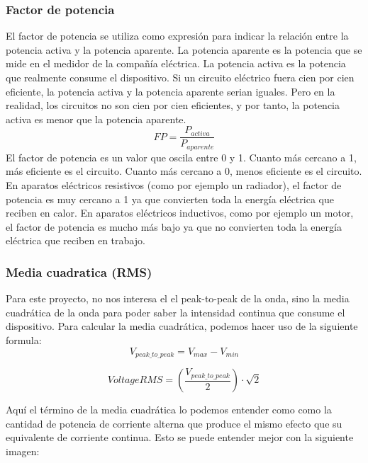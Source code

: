 \begin{titlepage}
\subsubsection{Factor de potencia}
El factor de potencia\cite{ref3} se utiliza como expresión para indicar la relación entre la potencia activa y la potencia aparente. La potencia aparente es la potencia que se mide en el medidor de la compañía eléctrica. La potencia activa es la potencia que realmente consume el dispositivo. Si un circuito eléctrico fuera cien por cien eficiente, la potencia activa y la potencia aparente serian iguales. Pero en la realidad, los circuitos no son cien por cien eficientes, y por tanto, la potencia activa es menor que la potencia aparente. \\
\begin{equation}
\label{eq:factor_potencia}
FP = \frac{P_{activa}}{P_{aparente}}
\end{equation}
El factor de potencia es un valor que oscila entre 0 y 1. Cuanto más cercano a 1, más eficiente es el circuito. Cuanto más cercano a 0, menos eficiente es el circuito. En aparatos eléctricos resistivos (como por ejemplo un radiador), el factor de potencia es muy cercano a 1 ya que convierten toda la energía eléctrica que reciben en calor. En aparatos eléctricos inductivos, como por ejemplo un motor, el factor de potencia es mucho más bajo ya que no convierten toda la energía eléctrica que reciben en trabajo.

\subsubsection{Media cuadratica (RMS)}
Para este proyecto, no nos interesa el el peak-to-peak de la onda, sino la media cuadrática\cite{ref4} de la onda para poder saber la intensidad continua que consume el dispositivo. Para calcular la media cuadrática, podemos hacer uso de la siguiente formula: \\
\begin{equation}
\label{eq:peak_to_peak}
	V_{peak\_to\_peak} = V_{max} - V_{min}
\end{equation}
	
\begin{equation}
\label{eq:media_cuadratica}
Voltage RMS = (\frac{V_{peak\_to\_peak}}{2}) \cdot \sqrt{2}
\end{equation}

Aquí el término de la media cuadrática lo podemos entender como como la cantidad de potencia de corriente alterna que produce el mismo efecto que su equivalente de corriente continua. Esto se puede entender mejor con la siguiente imagen:


\end{titlepage}

